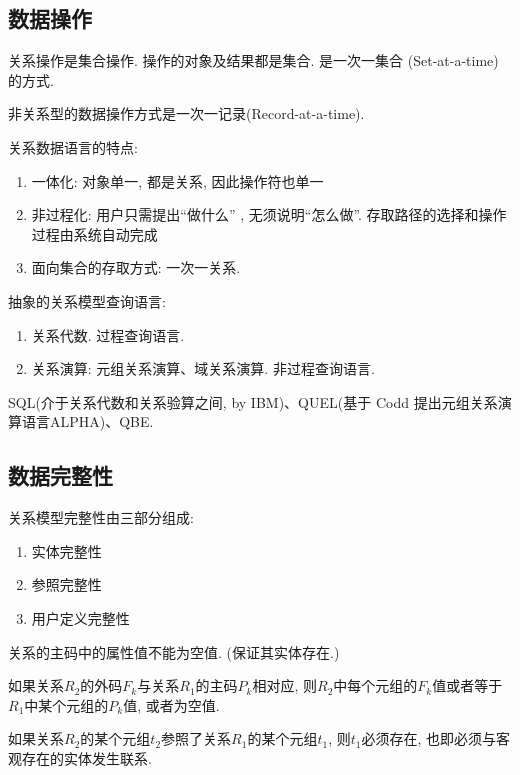 \subsection{数据操作}

关系操作是集合操作. 操作的对象及结果都是集合. 是一次一集合 (Set-at-a-time)的方式.

非关系型的数据操作方式是一次一记录(Record-at-a-time).

关系数据语言的特点:
\begin{enumerate}
    \item 一体化: 对象单一, 都是关系, 因此操作符也单一
    \item 非过程化: 用户只需提出“做什么” , 无须说明“怎么做”. 存取路径的选择和操作过程由系统自动完成
    \item 面向集合的存取方式: 一次一关系.
\end{enumerate}

抽象的关系模型查询语言:
\begin{enumerate}
    \item 关系代数. 过程查询语言.
    \item 关系演算: 元组关系演算、域关系演算. 非过程查询语言.
\end{enumerate}

SQL(介于关系代数和关系验算之间, by IBM)、QUEL(基于 Codd 提出元组关系演算语言ALPHA)、QBE.

\subsection{数据完整性}

\begin{definition}[关系模型完整性]
关系模型完整性由三部分组成:
\begin{enumerate}
    \item 实体完整性
    \item 参照完整性
    \item 用户定义完整性
\end{enumerate}
\end{definition}

\begin{definition}[实体完整性]
关系的主码中的属性值不能为空值. (保证其实体存在.)
\end{definition}

\begin{definition}[参照完整性]
如果关系$R_2$的外码$F_k$与关系$R_1$的主码$P_k$相对应, 
则$R_2$中每个元组的$F_k$值或者等于$R_1$中某个元组的$P_k$值, 或者为空值.

如果关系$R_2$的某个元组$t_2$参照了关系$R_1$的某个元组$t_1$, 则$t_1$必须存在, 
也即必须与客观存在的实体发生联系.
\end{definition}

